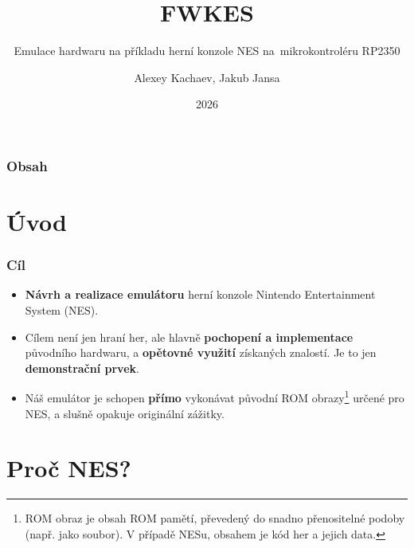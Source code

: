 \documentclass{beamer}
\title{FWKES}
\subtitle{Emulace hardwaru na příkladu herní konzole NES na~mikrokontroléru RP2350}
\author{Alexey Kachaev, Jakub Jansa}
\institute{Střední průmyslová škola elektrotechnická, Praha 2, Ječná 30}
\date{2026}
\begin{document}
\begin{frame}[plain]
\titlepage


\end{frame}


\begin{frame}
\frametitle{Obsah}
\tableofcontents
\end{frame}

\section{Úvod}

\begin{frame}
\frametitle{Cíl}

\begin{itemize}
    \item \textbf{Návrh a realizace emulátoru} herní konzole Nintendo Entertainment System
        (NES).
    \item Cílem není jen hraní her, ale hlavně \textbf{pochopení a implementace} původního
    hardwaru, a \textbf{opětovné využití} získaných znalostí. Je to jen \textbf{demonstrační prvek}.
    \item Náš emulátor je schopen \textbf{přímo}
        vykonávat původní ROM obrazy\footnote{ROM obraz je obsah ROM pamětí, převedený do snadno
        přenositelné podoby (např. jako soubor). V případě NESu, obsahem je kód her a jejich data.}
        určené pro NES, a slušně opakuje originální zážitky.
\end{itemize}

\end{frame}

\section{Proč NES?}
\end{document}
